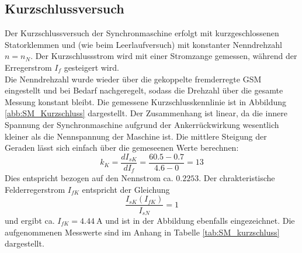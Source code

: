 \subsection{Kurzschlussversuch} 
Der Kurzschlussversuch der Synchronmaschine erfolgt mit kurzgeschlossenen Statorklemmen und (wie beim Leerlaufversuch) mit konstanter Nenndrehzahl $n=n_N$. Der Kurzschlussstrom wird mit einer Stromzange gemessen, während der Erregerstrom $I_f$ gesteigert wird. \\
Die Nenndrehzahl wurde wieder über die gekoppelte fremderregte GSM eingestellt und bei Bedarf nachgeregelt, sodass die Drehzahl über die gesamte Messung konstant bleibt. Die gemessene Kurzschlusskennlinie ist in Abbildung \ref{abb:SM_Kurzschluss} dargestellt. Der Zusammenhang ist linear, da die innere Spannung der Synchronmaschine aufgrund der Ankerrückwirkung wesentlich kleiner als die Nennspannung der Maschine ist. Die mittlere Steigung der Geraden lässt sich einfach über die gemeseenen Werte berechnen:
\begin{equation*}
    k_K = \frac{dI_{sK}}{dI_f} = \frac{60.5 - 0.7}{4.6 - 0} = 13
\end{equation*}
Dies entspricht bezogen auf den Nennstrom ca. $0.2253$. Der chrakteristische Felderregerstrom $I_{fK}$ entspricht der Gleichung 
\begin{equation*}
    \frac{I_{sK}(I_{fK})}{I_{sN}} = 1
\end{equation*}
und ergibt ca. $I_{fK} = \SI{4.44}{\ampere}$ und ist in der Abbildung ebenfalls eingezeichnet. Die aufgenommenen Messwerte sind im Anhang in Tabelle \ref{tab:SM_kurzschluss} dargestellt.

